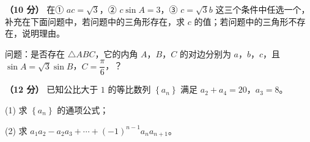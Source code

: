 \begin{question}
\textbf{（10 分）} 在① $ac=\sqrt3$，② $c\sin A=3$，③ $c=\sqrt3b$ 这三个条件中任选一个，补充在下面问题中，若问题中的三角形存在，求 $c$ 的值；若问题中的三角形不存在，说明理由。

问题：是否存在 $\triangle ABC$，它的内角 $A$，$B$，$C$ 的对边分别为 $a$，$b$，$c$，且 $\sin A=\sqrt3\sin B$，$C=\dfrac\pi6$，\gkblank{}？

\end{question}
\begin{question}
\textbf{（12 分）} 已知公比大于 $1$ 的等比数列 $\left\{a_n\right\}$ 满足 $a_2+a_4=20$，$a_3=8$。

  (1) 求 $\left\{a_n\right\}$ 的通项公式；

  (2) 求 $a_1a_2-a_2a_3+\cdots+(-1)^{n-1}a_na_{n+1}$。

\end{question}
